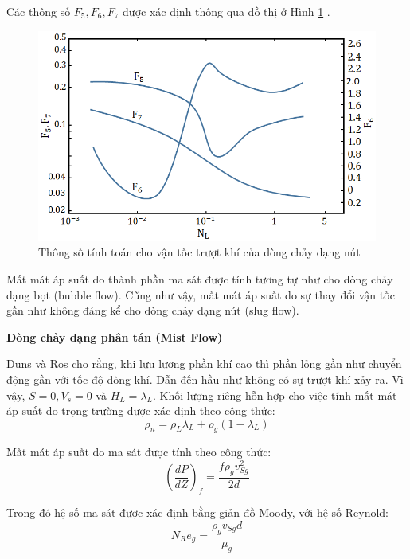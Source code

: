 \documentclass[12pt,a4paper]{report}
\begin{document}
Các thông số $F_5, F_6, F_7$ được xác định thông qua đồ thị ở Hình \ref{fig:f_5_f_6_f_7_for_v_slip_gas_duns_ros} \cite{brill1999multiphase}.
	\begin{figure}[h]
		\centering
		\includegraphics[scale=0.75]{Fig/f_5_f_6_f_7_for_v_slip_gas_duns_ros.png}
		\caption{Thông số tính toán cho vận tốc trượt khí của dòng chảy dạng nút}
		\label{fig:f_5_f_6_f_7_for_v_slip_gas_duns_ros}
	\end{figure}
\newline
Mất mát áp suất do thành phần ma sát được tính tương tự như cho dòng chảy dạng bọt (bubble flow). Cũng như vậy, mất mát áp suất do sự thay đổi vận tốc gần như không đáng kể cho dòng chảy dạng nút (slug flow).

\textbf{Dòng chảy dạng phân tán (Mist Flow)}

Duns và Ros cho rằng, khi lưu lương phần khí cao thì phần lỏng gần như chuyển động gần với tốc độ dòng khí. Dẫn đến hầu như không có sự trượt khí xảy ra. Vì vậy, $S=0, V_s=0 $ và $ H_L = \lambda_L$. Khối lượng riêng hỗn hợp cho việc tính mất mát áp suất do trọng trường được xác định theo công thức:
	\begin{equation}
    \rho_n=\rho_L\lambda_L+\rho_g(1-\lambda_L)
	\end{equation}
	
Mất mát áp suất do ma sát được tính theo công thức: 
	\begin{equation}
     (\dfrac{dP}{dZ})_f = \dfrac{f\rho_gv_{Sg}^2}{2d}
	\end{equation}

Trong đó hệ số ma sát được xác định bằng giản đồ Moody, với hệ số Reynold:
	\begin{equation}
     N_Re_g=\dfrac{\rho_gv_{Sg}d}{\mu_g}
    \end{equation}
    
\end{document}
